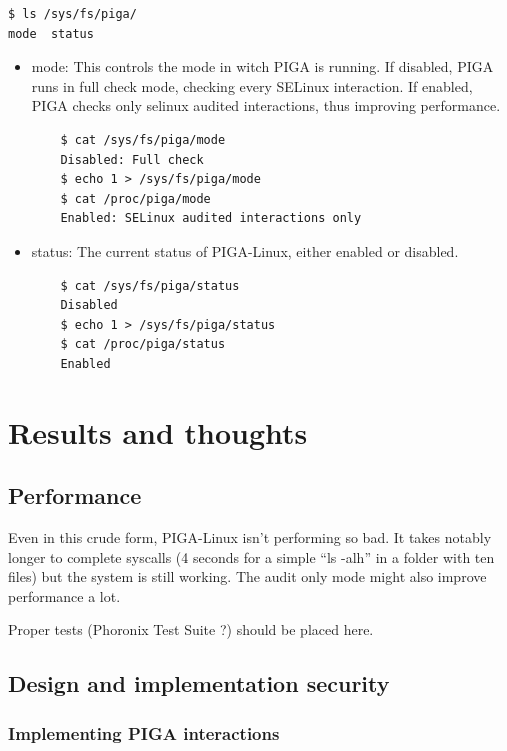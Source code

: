 \documentclass[pdftex,a4paper,titlepage,11pt]{article}
\begin{document}
\begin{lstlisting}
$ ls /sys/fs/piga/
mode  status
\end{lstlisting}

\begin{itemize}
	\item mode: This controls the mode in witch PIGA is running. If disabled, PIGA runs in full check mode, checking every SELinux interaction. If enabled, PIGA checks only selinux audited interactions, thus improving performance.
	\begin{lstlisting}
	$ cat /sys/fs/piga/mode
	Disabled: Full check
	$ echo 1 > /sys/fs/piga/mode
	$ cat /proc/piga/mode
	Enabled: SELinux audited interactions only
	\end{lstlisting}
	\item status: The current status of PIGA-Linux, either enabled or disabled.
	\begin{lstlisting}
	$ cat /sys/fs/piga/status
	Disabled
	$ echo 1 > /sys/fs/piga/status
	$ cat /proc/piga/status
	Enabled
	\end{lstlisting}
\end{itemize}

\newpage

\section{Results and thoughts}

\subsection{Performance}

Even in this crude form, PIGA-Linux isn't performing so bad. It takes notably longer to complete syscalls (4 seconds for a simple ``ls -alh'' in a folder with ten files) but the system is still working. The audit only mode might also improve performance a lot.

Proper tests (Phoronix Test Suite ?) should be placed here.

\subsection{Design and implementation security}

\subsubsection{Implementing PIGA interactions}
\end{document}
